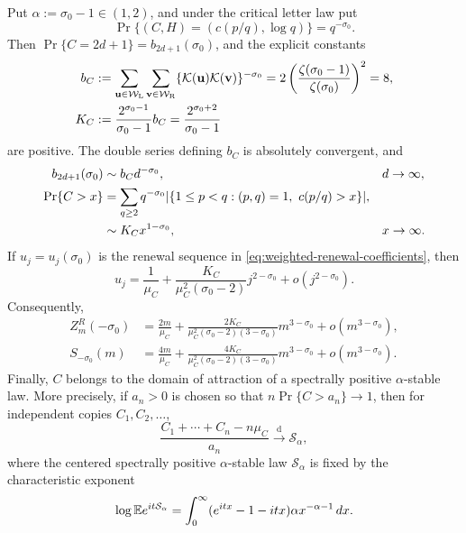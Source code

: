 \begin{theorem}
\label{thm:arithmetic-critical-stable-renewal}
Put \(\alpha:=\sigma_0-1\in(1,2)\), and under the critical letter law put
\[
 \Pr\{(C,H)=(c(p/q),\log q)\}=q^{-\sigma_0}.
\]
Then \(\Pr\{C=2d+1\}=b_{2d+1}(\sigma_0)\), and the explicit constants
\begin{equation}
 \begin{aligned}
 b_C&:=
 \sum_{\mathbf u\in\mathcal W_{\rm L}}
 \sum_{\mathbf v\in\mathcal W_{\rm R}}
 \{\mathcal K(\mathbf u)\mathcal K(\mathbf v)\}^{-\sigma_0}
 =2\left(\frac{\zeta(\sigma_0-1)}{\zeta(\sigma_0)}\right)^2=8,\\
 K_C&:=\frac{2^{\sigma_0-1}}{\sigma_0-1}b_C
 =\frac{2^{\sigma_0+2}}{\sigma_0-1}
 \end{aligned}
 \label{eq:critical-tail-constants}
\end{equation}
are positive.  The double series defining \(b_C\) is absolutely convergent,
and
\begin{align}
 b_{2d+1}(\sigma_0)&\sim b_Cd^{-\sigma_0},
 &&d\to\infty,
 \label{eq:critical-letter-local-tail}\\
 \Pr\{C>x\}
 &=\sum_{q\ge2}q^{-\sigma_0}
   \lvert \{1\le p<q:(p,q)=1,\ c(p/q)>x\} \rvert,\notag\\
 &\sim K_Cx^{1-\sigma_0},
 &&x\to\infty.
 \label{eq:critical-letter-tail}
\end{align}
If \(u_j=u_j(\sigma_0)\) is the renewal sequence in
\eqref{eq:weighted-renewal-coefficients}, then
\begin{equation}
 u_j=\frac1{\mu_C}
 +\frac{K_C}{\mu_C^2(\sigma_0-2)}j^{2-\sigma_0}
 +o(j^{2-\sigma_0}).
 \label{eq:critical-renewal-second-order}
\end{equation}
Consequently,
\begin{align}
 Z_m^R(-\sigma_0)
 &=\frac{2m}{\mu_C}
 +\frac{2K_C}{\mu_C^2(\sigma_0-2)(3-\sigma_0)}
   m^{3-\sigma_0}+o(m^{3-\sigma_0}),
 \label{eq:standard-layer-critical-second-order}\\
 S_{-\sigma_0}(m)
 &=\frac{4m}{\mu_C}
 +\frac{4K_C}{\mu_C^2(\sigma_0-2)(3-\sigma_0)}
   m^{3-\sigma_0}+o(m^{3-\sigma_0}).
 \label{eq:finite-window-critical-second-order}
\end{align}
Finally, \(C\) belongs to the domain of attraction of a spectrally positive
\(\alpha\)-stable law.  More precisely, if \(a_n>0\) is chosen so that
\(n\Pr\{C>a_n\}\to1\), then for independent copies \(C_1,C_2,\ldots\),
\begin{equation}
 \frac{C_1+\cdots+C_n-n\mu_C}{a_n}
 \xrightarrow{\mathrm d}\mathcal S_\alpha,
 \label{eq:critical-cost-stable-domain}
\end{equation}
where the centered spectrally positive \(\alpha\)-stable law
\(\mathcal S_\alpha\) is fixed by the characteristic exponent
\begin{equation}
 \log\mathbb{E} e^{it\mathcal S_\alpha}
 =\int_0^\infty
   (e^{itx}-1-itx)\alpha x^{-\alpha-1}\,dx.
 \label{eq:centered-stable-characteristic-exponent}
\end{equation}
\end{theorem}


